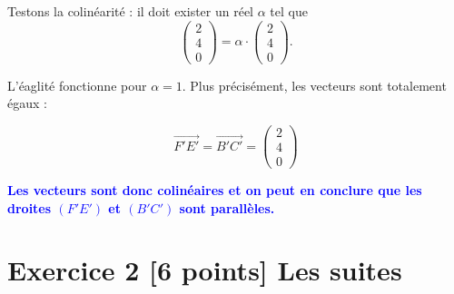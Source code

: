 \documentclass{exam}
\begin{document}
Testons la colinéarité : il doit exister un réel \(\alpha\) tel que 
\[
\begin{pmatrix}2 \\ 4 \\ 0\end{pmatrix} = \alpha \cdot \begin{pmatrix}2 \\ 4 \\ 0\end{pmatrix}.
\]

L'éaglité fonctionne pour $\alpha = 1$. Plus précisément, les vecteurs sont totalement égaux : 

\[
  \overrightarrow{F'E'} = \overrightarrow{B'C'} = \begin{pmatrix}2 \\ 4 \\ 0\end{pmatrix}
\]

\textbf{\textcolor{blue}{Les vecteurs sont donc colinéaires et on peut en conclure que les droites \((F'E')\) et \((B'C')\) sont parallèles.}}

\section*{Exercice 2 [6 points] Les suites}
\end{document}
